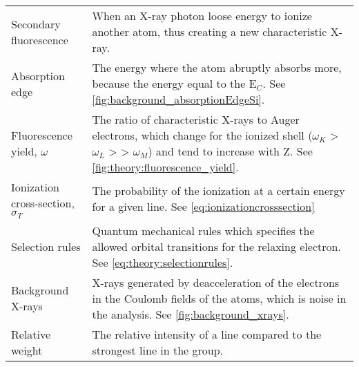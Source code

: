 \begin{table}[phb]
\begin{center}
\begin{tabular}{p{3cm}p{11.6cm}}
            Secondary fluorescence               & When an X-ray photon loose energy to ionize another atom, thus creating a new characteristic X-ray.                                                                                                         \\
            Absorption edge                      & The energy where the atom abruptly absorbs more, because the energy equal to the E$_C$.  See \cref{fig:background_absorptionEdgeSi}.                                                                        \\
            Fluorescence yield, $\omega$         & The ratio of characteristic X-rays to Auger electrons, which change for the ionized shell ($\omega_K$ > $\omega_L$ > > $\omega_M$) and tend to increase with Z.  See  \cref{fig:theory:fluorescence_yield}. \\
            Ionization cross-section, $\sigma_T$ & The probability of the ionization at a certain energy for a given line. See \cref{eq:ionizationcrosssection}                                                                                                \\
            Selection rules                      & Quantum mechanical rules which specifies the allowed orbital transitions for the relaxing electron. See \cref{eq:theory:selectionrules}.                                                                    \\
            Background X-rays                    & X-rays generated by deacceleration of the electrons in the Coulomb fields of the atoms, which is noise in the analysis. See \cref{fig:background_xrays}.                                                    \\
            Relative weight                      & The relative intensity of a line compared to the strongest line in the group.                                                                                                                               \\
            \hline
        \end{tabular}
    \end{center}
\end{table}